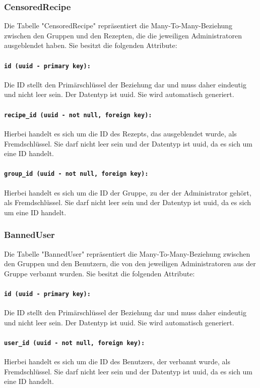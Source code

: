 \documentclass{entwurfsheft}
\begin{document}
\subsubsection{CensoredRecipe}
Die Tabelle "CensoredRecipe" repräsentiert die Many-To-Many-Beziehung zwischen den Gruppen und den Rezepten, die die jeweiligen Administratoren ausgeblendet haben. Sie besitzt die folgenden Attribute:
\paragraph{\texttt{id (uuid - primary key):}} Die ID stellt den Primärschlüssel der Beziehung dar und muss daher eindeutig und nicht leer sein. Der Datentyp ist \Gls{uuid}. Sie wird automatisch generiert.
\paragraph{\texttt{recipe\_id (uuid - not null, foreign key):}} Hierbei handelt es sich um die ID des Rezepts, das ausgeblendet wurde, als Fremdschlüssel. Sie darf nicht leer sein und der Datentyp ist \Gls{uuid}, da es sich um eine ID handelt.
\paragraph{\texttt{group\_id (uuid - not null, foreign key):}} Hierbei handelt es sich um die ID der Gruppe, zu der der Administrator gehört, als Fremdschlüssel. Sie darf nicht leer sein und der Datentyp ist \Gls{uuid}, da es sich um eine ID handelt.
\newpage

\subsubsection{BannedUser}
Die Tabelle "BannedUser" repräsentiert die Many-To-Many-Beziehung zwischen den Gruppen und den Benutzern, die von den jeweiligen Administratoren aus der Gruppe verbannt wurden. Sie besitzt die folgenden Attribute:
\paragraph{\texttt{id (uuid - primary key):}} Die ID stellt den Primärschlüssel der Beziehung dar und muss daher eindeutig und nicht leer sein. Der Datentyp ist \Gls{uuid}. Sie wird automatisch generiert.
\paragraph{\texttt{user\_id (uuid - not null, foreign key):}} Hierbei handelt es sich um die ID des Benutzers, der verbannt wurde, als Fremdschlüssel. Sie darf nicht leer sein und der Datentyp ist \Gls{uuid}, da es sich um eine ID handelt.
\end{document}
